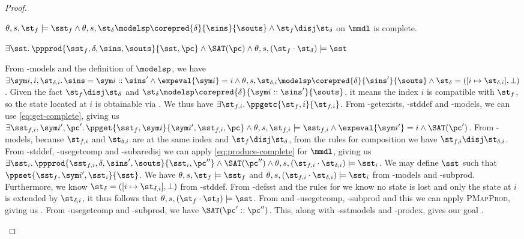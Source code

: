 \begin{proof}

\pfassume \begin{hypvlist}
 $\theta, s, \st_f \models \sst_f \land \theta, s, \st_\delta \modelsp \corepred{\delta}{\sins}{\souts} \land \st_f\disj\st_\delta$ 
 \produce{} on $\mmdl$ is complete.
\end{hypvlist}
\pfprove \begin{goalvlist}
 $\exists \sst\ldotp \ppprod{\sst_f,\delta,\sins,\souts}{\sst,\pc} \land \SAT(\pc) \land \theta,s,(\st_f\cdot\st_\delta) \models \sst$
\end{goalvlist}

\pfcase{$\delta \in \preds_\mmdl$}

\begin{hypvlist}
 From \hyp{models} and the definition of $\modelsp$, we have $\exists \sym i,i,\st_{\delta,i} \ldotp \sins=\sym i::\sins' \land \expeval{\sym i}=i \land \theta,s,\st_{\delta,i}\modelsp \corepred{\delta}{\sins'}{\souts} \land \st_\delta=([i\mapsto \st_{\delta,i}],\bot)$.
 Given the fact $\st_f\disj\st_\delta$ and $\st_\delta\modelsp\corepred{\delta}{\sym i::\sins'}{\souts}$, it means the index $i$ is compatible with $\st_f$, so the state located at $i$ is obtainable via . We thus have $\exists \st_{f,i} \ldotp {\ppgetc{\st_f,i}{\st_{f,i}}}$.
 From \hyp{getexists}, \hyp{stddef} and \hyp{models}, we can use \ref{eq:get-complete}, giving us $\exists \sst_{f,i},\sym i', \pc'\ldotp \ppget{\sst_f,\sym i}{\sym i',\sst_{f,i},\pc} \land \theta,s,\st_{f,i}\models\sst_{f,i} \land \expeval{\sym i'}=i \land \SAT(\pc')$.
 From \hyp{models}, because $\st_{f,i}$ and $\st_{\delta,i}$ are at the same index and $\st_f\disj\st_\delta$, from the rules for composition we have $\st_{f,i}\disj\st_{\delta,i}$.
 From \hyp{stddef}, \hyp{usegetcomp} and \hyp{subaredisj} we can apply \ref{eq:produce-complete} for $\mmdl$, giving us $\exists \sst_i\ldotp {\ppprod{\sst_{f,i},\delta,\sins',\souts}{\sst_i,\pc''}}\land\SAT(\pc'')\land \theta,s,(\st_{f,i}\cdot\st_{\delta,i})\models\sst_i$.
 We may define $\sst$ such that $\ppset{\sst_f,\sym i',\sst_i}{\sst}$.
 We have $\theta, s, \st_f \models \sst_f$ and ${\theta,s,(\st_{f,i}\cdot\st_{\delta,i})\models\sst_i}$ from \hyp{models} and \hyp{subprod}. Furthermore, we know $\st_\delta=([i\mapsto \st_{\delta,i}],\bot)$ from \hyp{stddef}. From \hyp{defsst} and the rules for  we know no state is lost and only the state at $i$ is extended by $\st_{\delta,i}$, it thus follows that $\theta,s,(\st_f\cdot\st_\delta)\models\sst$.%
 From and \hyp{usegetcomp}, \hyp{subprod} and this we can apply \textsc{PMapProd}, giving us .
 From \hyp{usegetcomp} and \hyp{subprod}, we have $\SAT(\pc'::\pc'')$. This, along with \hyp{sstmodels} and \hyp{prodex}, gives our goal .
\end{hypvlist}


\end{proof}

